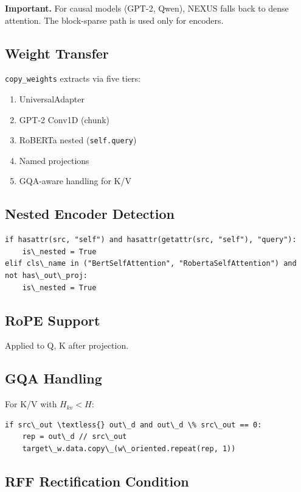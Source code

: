 \textbf{Important.} For causal models (GPT-2, Qwen), NEXUS falls back to dense 
attention. The block-sparse path is used only for encoders.

\subsection{Weight Transfer}

\texttt{copy\_weights} extracts via five tiers:

\begin{enumerate}
\item UniversalAdapter
\item GPT-2 Conv1D (chunk)
\item RoBERTa nested (\texttt{self.query})
\item Named projections
\item GQA-aware handling for K/V

\end{enumerate}
\subsection{Nested Encoder Detection}

\begin{lstlisting}
if hasattr(src, "self") and hasattr(getattr(src, "self"), "query"):
    is\_nested = True
elif cls\_name in ("BertSelfAttention", "RobertaSelfAttention") and not has\_out\_proj:
    is\_nested = True
\end{lstlisting}

\subsection{RoPE Support}

Applied to Q, K after projection.

\subsection{GQA Handling}

For K/V with $H_{kv} < H$:

\begin{lstlisting}
if src\_out \textless{} out\_d and out\_d \% src\_out == 0:
    rep = out\_d // src\_out
    target\_w.data.copy\_(w\_oriented.repeat(rep, 1))
\end{lstlisting}

\subsection{RFF Rectification Condition}

